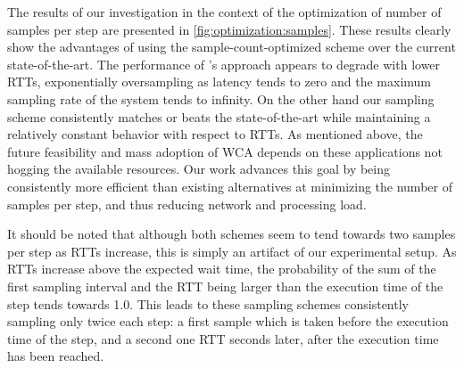 The results of our investigation in the context of the optimization of number of samples per step are presented in \cref{fig:optimization:samples}.
These results clearly show the advantages of using the sample-count-optimized scheme over the current state-of-the-art.
The performance of \textcite{wang2019towards}'s approach appears to degrade with lower \glspl{RTT}, exponentially oversampling as latency tends to zero and the maximum sampling rate of the system tends to infinity.
On the other hand our sampling scheme consistently matches or beats the state-of-the-art while maintaining a relatively constant behavior with respect to \glspl{RTT}.
As mentioned above, the future feasibility and mass adoption of \gls{WCA} depends on these applications not hogging the available resources.
Our work advances this goal by being consistently more efficient than existing alternatives at minimizing the number of samples per step, and thus reducing network and processing load.

It should be noted that although both schemes seem to tend towards two samples per step as \glspl{RTT} increase, this is simply an artifact of our experimental setup.
As \glspl{RTT} increase above the expected wait time, the probability of the sum of the first sampling interval and the \gls{RTT} being larger than the execution time of the step tends towards \num{1.0}.
This leads to these sampling schemes consistently sampling only twice each step: a first sample which is taken before the execution time of the step, and a second one \gls{RTT} seconds later, after the execution time has been reached.

